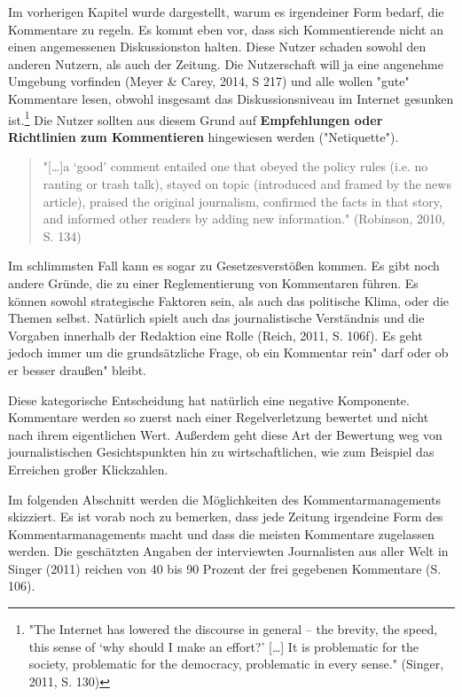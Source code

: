 Im vorherigen Kapitel wurde dargestellt, warum es irgendeiner Form bedarf, die Kommentare zu regeln. 
Es kommt eben vor, dass sich Kommentierende nicht an einen angemessenen Diskussionston halten. Diese Nutzer schaden sowohl den anderen Nutzern, als auch der Zeitung. Die Nutzerschaft will ja eine angenehme Umgebung vorfinden (Meyer \& Carey, 2014, S 217) und alle wollen "gute" Kommentare lesen, obwohl insgesamt das Diskussionsniveau im Internet gesunken ist.\footnote{"The Internet has lowered the
discourse in general – the brevity, the speed, this sense of ‘why should I make
an effort?' [\ldots] It is problematic for the society, problematic for the democracy, problematic in every sense." (Singer, 2011, S. 130)}
Die Nutzer sollten aus diesem Grund auf {\bf Empfehlungen oder Richtlinien zum Kommentieren} hingewiesen werden ("Netiquette"). 


\begin{quote}
"[\ldots]a ‘good’ comment entailed one that obeyed the policy rules (i.e. no
ranting or trash talk), stayed on topic (introduced and framed by the news article), praised
the original journalism, confirmed the facts in that story, and informed other readers by
adding new information." (Robinson, 2010, S. 134)
\end{quote}

Im schlimmsten Fall kann es sogar zu Gesetzesverstößen kommen. Es gibt noch andere Gründe, die zu einer Reglementierung von Kommentaren führen. Es können sowohl strategische Faktoren sein, als auch das politische Klima, oder die Themen selbst. Natürlich spielt auch das journalistische Verständnis und die Vorgaben innerhalb der Redaktion eine Rolle (Reich, 2011, S. 106f).
Es geht jedoch immer um die grundsätzliche Frage, ob ein Kommentar \glqq rein" darf oder ob er besser \glqq draußen"  bleibt.

Diese kategorische Entscheidung hat natürlich eine negative Komponente. Kommentare werden so zuerst nach einer Regelverletzung bewertet und nicht nach ihrem eigentlichen Wert. Außerdem geht diese Art der Bewertung weg von journalistischen Gesichtspunkten hin zu wirtschaftlichen, wie zum Beispiel das Erreichen großer Klickzahlen.  

Im folgenden Abschnitt werden die Möglichkeiten des Kommentarmanagements skizziert. Es ist vorab noch zu bemerken, dass jede Zeitung irgendeine Form des Kommentarmanagements macht und dass die meisten Kommentare zugelassen werden. Die geschätzten Angaben der interviewten Journalisten aus aller Welt in Singer (2011) reichen von 40 bis 90 Prozent der frei gegebenen Kommentare (S. 106). 


